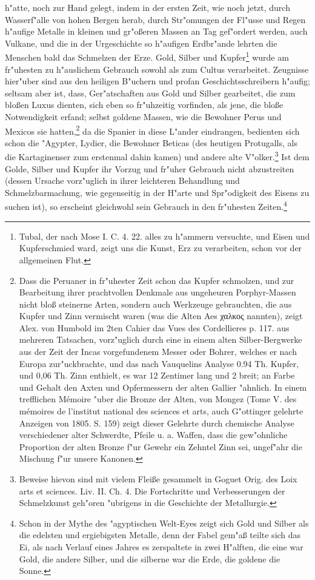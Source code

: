 \documentclass[a4paper, 11pt, oneside, polutonikogreek, german]{article}
\begin{document}
h"atte, noch zur Hand gelegt, indem in der ersten Zeit, wie noch jetzt, durch Wasserf"alle von hohen Bergen herab, durch Str"omungen der Fl"usse und Regen h"aufige Metalle in kleinen und gr"oßeren Massen an Tag gef"ordert werden, auch Vulkane, und die in der Urgeschichte so h"aufigen Erdbr"ande lehrten die Menschen bald das Schmelzen der Erze. Gold, Silber und Kupfer\footnote{Tubal, der nach Mose I. C. 4. 22. alles zu h"ammern versuchte, und Eisen und Kupferschmied ward, zeigt uns die Kunst, Erz zu verarbeiten, schon vor der allgemeinen Flut.} wurde am fr"uhesten zu h"auslichem Gebrauch sowohl als zum Cultus verarbeitet. Zeugnisse hier"uber sind aus den heiligen B"uchern und profan Geschichtsschreibern h"aufig; seltsam aber ist, dass, Ger"atschaften aus Gold und Silber gearbeitet, die zum bloßen Luxus dienten, sich eben so fr"uhzeitig vorfinden, als jene, die bloße Notwendigkeit erfand; selbst goldene Massen, wie die Bewohner Perus und Mexicos sie hatten,\footnote{Dass die Peruaner in fr"uhester Zeit schon das Kupfer schmolzen, und zur Bearbeitung ihrer prachtvollen Denkmale aus ungeheuren Porphyr-Massen nicht bloß steinerne Arten, sondern auch Werkzeuge gebrauchten, die aus Kupfer und Zinn vermischt waren (was die Alten Aes χαλκος nannten), zeigt Alex. von Humbold im 2ten Cahier das Vues des Cordellieres p. 117. aus mehreren Tatsachen, vorz"uglich durch eine in einem alten Silber-Bergwerke aus der Zeit der Incas vorgefundenem Messer oder Bohrer, welches er nach Europa zur"uckbrachte, und das nach Vauquelins Analyse 0.94 Th. Kupfer, und 0,06 Th. Zinn enthielt, es war 12 Zentimer lang und 2 breit; an Farbe und Gehalt den Axten und Opfermessern der alten Gallier "ahnlich. In einem trefflichen Mémoire "uber die Bronze der Alten, von Mongez (Tome V. des mémoires de l'institut national des sciences et arts, auch G"ottinger gelehrte Anzeigen von 1805. S. 159) zeigt dieser Gelehrte durch chemische Analyse verschiedener alter Schwerdte, Pfeile u. a. Waffen, dass die gew"ohnliche Proportion der alten Bronze f"ur Gewehr ein Zehntel Zinn sei, ungef"ahr die Mischung f"ur unsere Kanonen.} da die Spanier in diese L"ander eindrangen, bedienten sich schon die "Agypter, Lydier, die Bewohner Beticas (des heutigen Protugalls, als die Kartaginenser zum erstenmal dahin kamen) und andere alte V"olker.\footnote{Beweise hievon sind mit vielem Fleiße gesammelt in Goguet Orig. des Loix arts et sciences. Liv. II. Ch. 4. Die Fortschritte und Verbesserungen der Schmelzkunst geh"oren "ubrigens in die Geschichte der Metallurgie.} Ist dem Golde, Silber und Kupfer ihr Vorzug und fr"uher Gebrauch nicht abzustreiten (dessen Ursache vorz"uglich in ihrer leichteren Behandlung und Schmelzbarmachung, wie gegenseitig in der H"arte und Spr"odigkeit des Eisens zu suchen ist), so erscheint gleichwohl sein Gebrauch in den fr"uhesten Zeiten.\footnote{Schon in der Mythe des "agyptischen Welt-Eyes zeigt sich Gold und Silber als die edelsten und ergiebigsten Metalle, denn der Fabel gem"aß teilte sich das Ei, als nach Verlauf eines Jahres es zerspaltete in zwei H"alften, die eine war Gold, die andere Silber, und die silberne war die Erde, die goldene die Sonne.}
\end{document}
